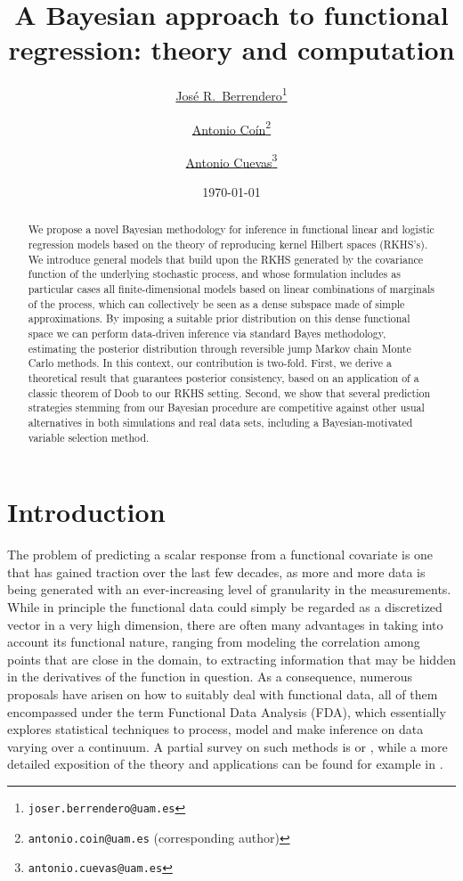 \documentclass{article}
\title{A Bayesian approach to functional regression: theory and computation}
\date{\today}
\author[1,2]{%
	\href{https://orcid.org/0000-0003-0728-7748}{\usebox{\orcid}\hspace{1mm}José R.~Berrendero\thanks{\texttt{\href{mailto:joser.berrendero@uam.es}{joser.berrendero@uam.es}}}}%
}
\author[1]{%
	\href{https://orcid.org/0009-0004-7554-9193}{\usebox{\orcid}\hspace{1mm}Antonio Coín\thanks{\texttt{\href{mailto:antonio.coin@uam.es}{antonio.coin@uam.es}} (corresponding author)}}%
}
\author[1,2]{%
	\href{https://orcid.org/0000-0002-7993-0096}{\usebox{\orcid}\hspace{1mm}Antonio Cuevas\thanks{\texttt{\href{mailto:antonio.cuevas@uam.es}{antonio.cuevas@uam.es}}}}%
}
\affil[1]{Departamento de Matemáticas, Universidad Autónoma de Madrid (UAM), Madrid, Spain}
\affil[2]{Instituto de Ciencias Matemáticas ICMAT (CSIC-UAM-UC3M-UCM), Madrid, Spain}
\numberwithin{equation}{section}
\theoremstyle{plain}
\theoremstyle{definition}
\begin{document}
  \maketitle

  \begin{abstract}
    We propose a novel Bayesian methodology for inference in functional linear and logistic regression models based on the theory of reproducing kernel Hilbert spaces (RKHS's). We introduce general models that build upon the RKHS generated by the covariance function of the underlying stochastic process, and whose formulation includes as particular cases all finite-dimensional models based on linear combinations of marginals of the process, which can collectively be seen as a dense subspace made of simple approximations. By imposing a suitable prior distribution on this dense functional space we can perform data-driven inference via standard Bayes methodology, estimating the posterior distribution through reversible jump Markov chain Monte Carlo methods. In this context, our contribution is two-fold. First, we derive a theoretical result that guarantees posterior consistency, based on an application of a classic theorem of Doob to our RKHS setting. Second, we show that several prediction strategies stemming from our Bayesian procedure are competitive against other usual alternatives in both simulations and real data sets, including a Bayesian-motivated variable selection method.
  \end{abstract}




\section{Introduction}\label{sec:intro}

The problem of predicting a scalar response from a functional covariate is one that has gained traction over the last few decades, as more and more data is being generated with an ever-increasing level of granularity in the measurements. While in principle the functional data could simply be regarded as a discretized vector in a very high dimension, there are often many advantages in taking into account its functional nature, ranging from modeling the correlation among points that are close in the domain, to extracting information that may be hidden in the derivatives of the function in question. As a consequence, numerous proposals have arisen on how to suitably deal with functional data, all of them encompassed under the term Functional Data Analysis (FDA), which essentially explores statistical techniques to process, model and make inference on data varying over a continuum. A partial survey on such methods is \citet{cuevas2014partial} or \citet{goia2016introduction}, while a more detailed exposition of the theory and applications can be found for example in \citet{hsing2015theoretical}.
\end{document}
